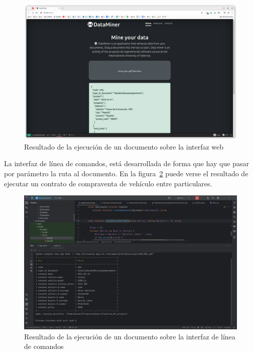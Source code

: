 \begin{figure}[ht]
    \begin{center}
        \includegraphics[width=\textwidth]{./chapter/5/images/chapter_5.1.web_interface}
        \caption{Resultado de la ejecución de un documento sobre la interfaz web}
        \label{fig:chapter_5.1.web_interface}
    \end{center}
\end{figure}

La interfaz de línea de comandos, está desarrollada de forma que hay que pasar por parámetro la ruta al documento.
En la figura~\ref{fig:chapter_5.1.cli_interface} puede verse el resultado de ejecutar un contrato de compraventa de
vehículo entre particulares.

\begin{figure}[ht]
    \begin{center}
        \includegraphics[width=\textwidth]{./chapter/5/images/chapter_5.1.cli_interface}
        \caption{Resultado de la ejecución de un documento sobre la interfaz de línea de comandos}
        \label{fig:chapter_5.1.cli_interface}
    \end{center}
\end{figure}
